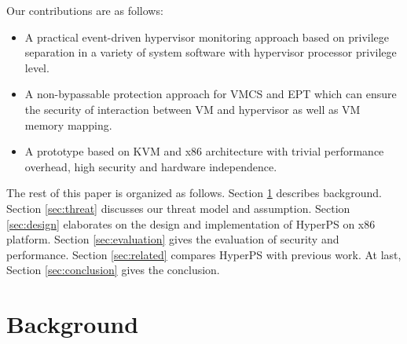 \documentclass[conference]{IEEEtran}
\begin{document}
Our contributions are as follows:
\begin{itemize}

\item{A practical event-driven hypervisor monitoring approach based on privilege separation in a variety of system software with hypervisor processor privilege level.}%
\item{A non-bypassable protection approach for VMCS and EPT which can ensure the security of interaction between VM and hypervisor as well as VM memory mapping.}
\item{A prototype based on KVM and x86 architecture with trivial performance overhead, high security and hardware independence.}%
\end{itemize}

The rest of this paper is organized as follows. Section \ref{background} describes background. Section \ref{sec:threat} discusses our threat model and assumption. Section \ref{sec:design} elaborates on the design and implementation of HyperPS on x86 platform. Section \ref{sec:evaluation} gives the evaluation of security and performance. Section \ref{sec:related} compares HyperPS with previous work. At last, Section \ref{sec:conclusion} gives the conclusion.

%
%
%
%
%


\section{Background}\label{background}
\end{document}
